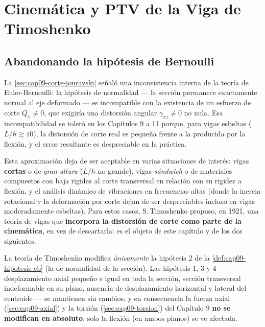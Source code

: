 \chapter{Cinemática y PTV de la Viga de Timoshenko}
\label{chap:cap12-cinematica-ptv-timoshenko}

\section{Abandonando la hipótesis de Bernoulli}
\label{sec:cap12-introduccion}

La \cref{sec:cap09-corte-jouravski} señaló una inconsistencia interna de la teoría de Euler-Bernoulli: la hipótesis de normalidad --- la sección permanece exactamente normal al eje deformado --- es incompatible con la existencia de un esfuerzo de corte $Q_x\neq0$, que exigiría una distorsión angular $\gamma_{xz}\neq0$ no nula. Esa incompatibilidad se toleró en los Capítulos 9 a 11 porque, para vigas esbeltas ($L/h\gtrsim10$), la distorsión de corte real es pequeña frente a la producida por la flexión, y el error resultante es despreciable en la práctica.

Esta aproximación deja de ser aceptable en varias situaciones de interés: vigas \textbf{cortas} o de \emph{gran altura} ($L/h$ no grande), vigas \emph{sándwich} o de materiales compuestos con baja rigidez al corte transversal en relación con su rigidez a flexión, y el análisis dinámico de vibraciones en frecuencias altas (donde la inercia rotacional y la deformación por corte dejan de ser despreciables incluso en vigas moderadamente esbeltas). Para estos casos, S.\,Timoshenko propuso, en 1921, una teoría de vigas que \textbf{incorpora la distorsión de corte como parte de la cinemática}, en vez de descartarla: es el objeto de este capítulo y de los dos siguientes.

\begin{observacion}
La teoría de Timoshenko modifica \emph{únicamente} la hipótesis 2 de la \cref{def:cap09-hipotesis-eb} (la de normalidad de la sección). Las hipótesis 1, 3 y 4 --- desplazamiento axial pequeño e igual en toda la sección, sección transversal indeformable en su plano, ausencia de desplazamiento horizontal y lateral del centroide --- se mantienen sin cambios, y en consecuencia la fuerza axial (\cref{sec:cap09-axial}) y la torsión (\cref{sec:cap09-torsion}) del Capítulo 9 \textbf{no se modifican en absoluto}: solo la flexión (en ambos planos) se ve afectada.
\end{observacion}

